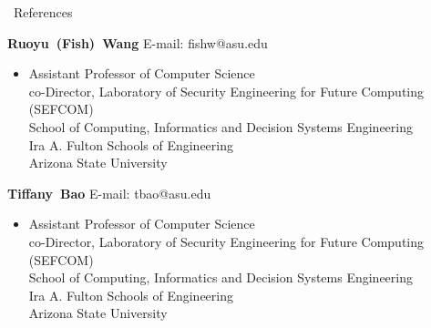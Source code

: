\documentclass{resume} %
\newenvironment{innerlist}[1][\enskip\textbullet]%
{\begin{itemize}[#1,leftmargin=*,parsep=0pt,itemsep=0pt,topsep=0pt,partopsep=0pt]}
	{\end{itemize}}
\newcommand{\halfblankline}{\quad\vspace{-0.5\baselineskip}\pagebreak[3]}
\begin{document}
\begin{rSection}{\faGenderless~References}
	\halfblankline

	\textbf{Ruoyu~(Fish)~Wang} \hfill{E-mail: fishw@asu.edu}
	\begin{innerlist}
		\item[] 
		Assistant Professor of Computer Science \\
		co-Director, Laboratory of Security Engineering for Future Computing (SEFCOM) \\
		School of Computing, Informatics and Decision Systems Engineering \\
		Ira A. Fulton Schools of Engineering \\
		Arizona State University
	\end{innerlist}

	\halfblankline

	\textbf{Tiffany~Bao} \hfill{E-mail: tbao@asu.edu}
	\begin{innerlist}
		\item[] 
		Assistant Professor of Computer Science \\
		co-Director, Laboratory of Security Engineering for Future Computing (SEFCOM) \\
		School of Computing, Informatics and Decision Systems Engineering \\
		Ira A. Fulton Schools of Engineering \\
		Arizona State University
	\end{innerlist}
	


	
\end{rSection}

\end{document}
